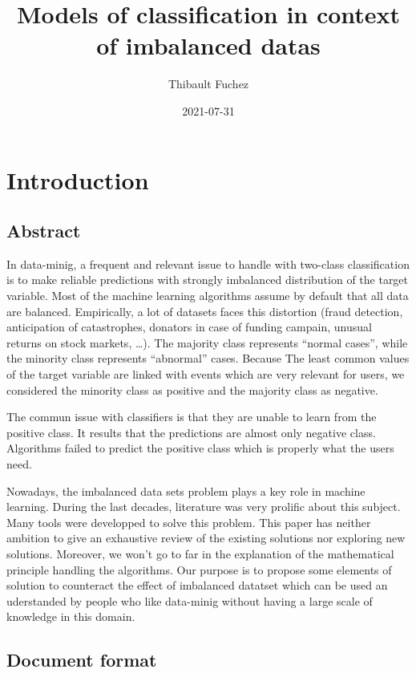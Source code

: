 \documentclass[
]{report}
\title{Models of classification in context of imbalanced datas}
\author{Thibault Fuchez}
\date{2021-07-31}
\begin{document}
\maketitle

{
\setcounter{tocdepth}{1}
\tableofcontents
}
\hypertarget{introduction}{%
\chapter{Introduction}\label{introduction}}

\hypertarget{abstract}{%
\section{Abstract}\label{abstract}}

In data-minig, a frequent and relevant issue to handle with two-class classification is to make reliable predictions with strongly imbalanced distribution of the target variable. Most of the machine learning algorithms assume by default that all data are balanced. Empirically, a lot of datasets faces this distortion (fraud detection, anticipation of catastrophes, donators in case of funding campain, unusual returns on stock markets, \ldots). The majority class represents ``normal cases'', while the minority class represents ``abnormal'' cases. Because The least common values of the target variable are linked with events which are very relevant for users, we considered the minority class as positive and the majority class as negative.

The commun issue with classifiers is that they are unable to learn from the positive class. It results that the predictions are almost only negative class. Algorithms failed to predict the positive class which is properly what the users need.

Nowadays, the imbalanced data sets problem plays a key role in machine learning. During the last decades, literature was very prolific about this subject. Many tools were developped to solve this problem. This paper has neither ambition to give an exhaustive review of the existing solutions nor exploring new solutions. Moreover, we won't go to far in the explanation of the mathematical principle handling the algorithms. Our purpose is to propose some elements of solution to counteract the effect of imbalanced datatset which can be used an uderstanded by people who like data-minig without having a large scale of knowledge in this domain.

\hypertarget{document-format}{%
\section{Document format}\label{document-format}}
\end{document}
